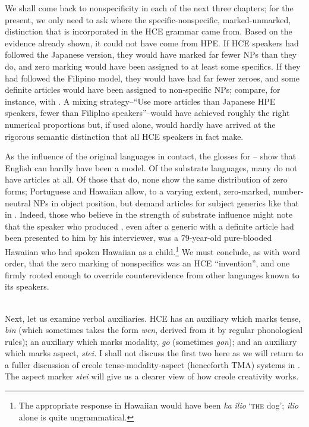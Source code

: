 We shall come back to nonspecificity in each of the next three chapters; for the present, we only need to ask where the specific-nonspecific, marked-unmarked, distinction that is incorporated in the HCE grammar came from. Based on the evidence already shown, it could not have come from HPE. If HCE speakers had followed the Japanese version, they would have marked far fewer NPs than they do, and zero marking would have been assigned to at least some specifics. If they had followed the Filipino model, they would have had far fewer zeroes, and some definite articles would have been assigned to non-specific NPs; compare, for instance,  with . A mixing strategy--``Use more articles than Japanese HPE speakers, fewer than Filiplno speakers''--would have achieved roughly the right numerical proportions but, if used alone, would hardly have arrived at the rigorous semantic distinction that all HCE speakers in fact make.

As the influence of the original languages in contact, the glosses for -- show that English can hardly have been a model. Of the substrate languages, many do not have articles at all. Of those that do, none show the same distribution of zero forms; Portuguese and Hawaiian allow, to a varying extent, zero-marked, number-neutral NPs in object position, but demand articles for subject generics like that in . Indeed, those who believe in the strength of substrate
influence might note that the speaker who produced , even after a generic with a definite article had been presented to him by his inter\-viewer, was a 79-year-old pure-blooded Hawaiian who had spoken Hawaiian as a child.\footnote{The appropriate response in Hawaiian would have been \textit{ka} \textit{ilio} `\textsc{the} dog'; \textit{ilio} alone is quite ungrammatical.} We must conclude, as with word order, that the zero marking of nonspecifics was an HCE ``invention'', and one firmly rooted enough to override counterevidence from other languages known to its speakers.\\\\

Next, let us examine verbal auxiliaries. HCE has an auxiliary which marks tense, \textit{bin} (which sometimes takes the form \textit{wen}, derived from it by regular phonological rules); an auxiliary which marks modality, \textit{go} (sometimes \textit{gon}); and an auxiliary which marks aspect, \textit{stei.} I shall not discuss the first two here as we will return to a fuller discus\-sion of creole tense-modality-aspect (henceforth TMA) systems in . The aspect marker \textit{stei} will give us a clearer view of how creole creativity works.

